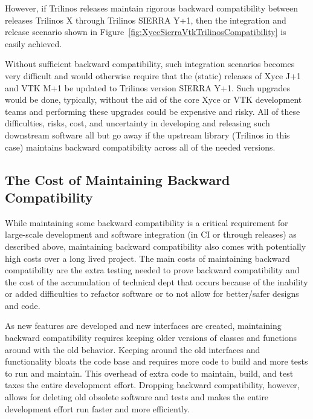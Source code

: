 \documentclass[11pt]{SANDreport}
\begin{document}
However, if Trilinos releases maintain rigorous backward compatibility
between releases Trilinos X through Trilinos SIERRA Y+1, then the
integration and release scenario shown in
Figure~\ref{fig:XyceSierraVtkTrilinosCompatibility} is easily
achieved.

Without sufficient backward compatibility, such integration scenarios
becomes very difficult and would otherwise require that the (static)
releases of Xyce J+1 and VTK M+1 be updated to Trilinos version SIERRA
Y+1.  Such upgrades would be done, typically, without the aid of the
core Xyce or VTK development teams and performing these upgrades could
be expensive and risky.  All of these difficulties, risks, cost, and
uncertainty in developing and releasing such downstream software all
but go away if the upstream library (Trilinos in this case) maintains
backward compatibility across all of the needed versions.


%
{}\subsection{The Cost of Maintaining Backward Compatibility}
\label{sec:costs_of_back_compat}
%

While maintaining some backward compatibility is a critical
requirement for large-scale development and software integration (in
CI or through releases) as described above, maintaining backward
compatibility also comes with potentially high costs over a long lived
project.  The main costs of maintaining backward compatibility are the
extra testing needed to prove backward compatibility and the cost of
the accumulation of technical dept that occurs because of the
inability or added difficulties to refactor software or to not allow
for better/safer designs and code.

As new features are developed and new interfaces are created,
maintaining backward compatibility requires keeping older versions of
classes and functions around with the old behavior.  Keeping around the
old interfaces and functionality bloats the code base and requires
more code to build and more tests to run and maintain.  This overhead
of extra code to maintain, build, and test taxes the entire
development effort.  Dropping backward compatibility, however, allows
for deleting old obsolete software and tests and makes the entire
development effort run faster and more efficiently.
\end{document}
